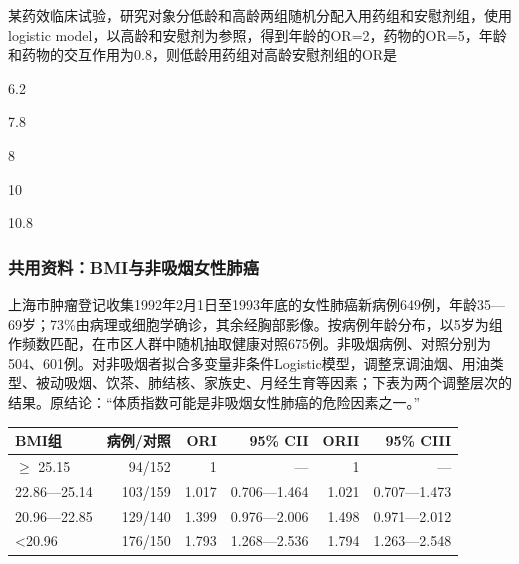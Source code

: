 \par\addvspace{8pt}\noindent\begin{minipage}{\linewidth}


某药效临床试验，研究对象分低龄和高龄两组随机分配入用药组和安慰剂组，使用logistic model，以高龄和安慰剂为参照，得到年龄的OR=2，药物的OR=5，年龄和药物的交互作用为0.8，则低龄用药组对高龄安慰剂组的OR是


\begin{choices}

\item 6.2

\item 7.8

\item 8

\item 10

\item 10.8

\end{choices}

\end{minipage}\par\vspace{5pt}

\subsubsection*{共用资料：BMI与非吸烟女性肺癌}

上海市肿瘤登记收集1992年2月1日至1993年底的女性肺癌新病例649例，年龄35---69岁；73\%由病理或细胞学确诊，其余经胸部影像。按病例年龄分布，以5岁为组作频数匹配，在市区人群中随机抽取健康对照675例。非吸烟病例、对照分别为504、601例。对非吸烟者拟合多变量非条件Logistic模型，调整烹调油烟、用油类型、被动吸烟、饮茶、肺结核、家族史、月经生育等因素；下表为两个调整层次的结果。原结论：``体质指数可能是非吸烟女性肺癌的危险因素之一。''

\begin{center}\small\setlength{\tabcolsep}{3.5pt}\renewcommand{\arraystretch}{1.18}\begin{tabular}{@{}lrrrrr@{}}
\toprule
BMI组 & 病例/对照 & ORI & 95\% CII & ORII & 95\% CIII \\
\midrule

\(\ge\) 25.15 & 94/152 & 1 & --- & 1 & --- \\
22.86---25.14 & 103/159 & 1.017 & 0.706---1.464 & 1.021 & 0.707---1.473 \\
20.96---22.85 & 129/140 & 1.399 & 0.976---2.006 & 1.498 & 0.971---2.012 \\
\textless20.96 & 176/150 & 1.793 & 1.268---2.536 & 1.794 & 1.263---2.548 \\
\bottomrule\end{tabular}\end{center}

